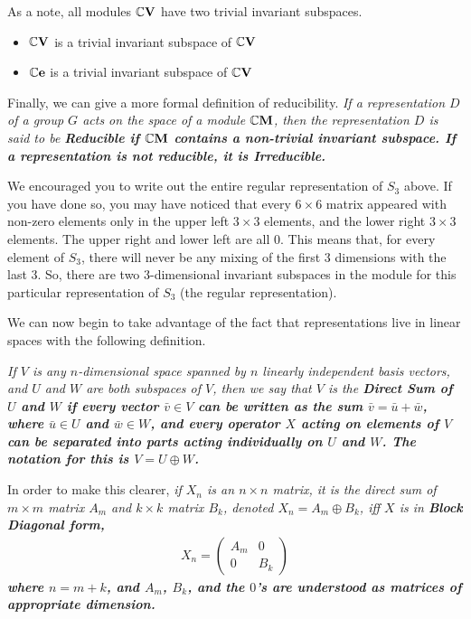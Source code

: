 \documentclass[12pt,epsf]{article}
\def\nolabel{\nonumber }
\def\nolabel{\nonumber }
\begin{document}
As a note, all modules $\mathbb{C}\bf V \rm$ have two trivial invariant
subspaces.
\begin{itemize}
\parskip 0pt
\item $\mathbb{C}\bf V\rm$ is a trivial invariant subspace of
$\mathbb{C}\bf V\rm$
\item $\mathbb{C}\bf e\rm$ is a trivial invariant subspace of
$\mathbb{C}\bf V\rm$
\end{itemize}  

Finally, we can give a more formal definition of reducibility.	\it If
a representation $D$ of a group $G$ acts on the space of a module
$\mathbb{C}\bf M\it$, then the representation $D$ is said to be \bf
Reducible \it if $\mathbb{C}\bf M\it$ contains a non-trivial invariant
subspace.  If a representation is not reducible, it is \bf
Irreducible\rm.  

We encouraged you to write out the entire regular representation of
$S_3$ above.  If you have done so, you may have noticed that every
$6\times 6$ matrix appeared with non-zero elements only in the upper
left $3\times 3$ elements, and the lower right $3\times 3$ elements. 
The upper right and lower left are all 0.  This means that, for every
element of $S_3$, there will never be any mixing of the first 3
dimensions with the last 3.  So, there are two 3-dimensional
invariant subspaces in the module for this particular representation of
$S_3$ (the regular representation).  

We can now begin to take advantage of the fact that representations
live in linear spaces with the following definition.  

\it If $V$ is any $n$-dimensional space spanned by $n$ linearly
independent basis vectors, and $U$ and $W$ are both subspaces of $V$,
then we say that $V$ is the \bf Direct Sum \it of $U$ and $W$ if every
vector $\bar v \in V$ can be written as the sum $\bar v = \bar u + \bar
w$, where $\bar u \in U$ and $\bar w \in W$, and every operator $X$
acting on elements of $V$ can be separated into parts acting
individually on $U$ and $W$.  The notation for this is $V = U \oplus
W$.  \rm

In order to make this clearer, \it if $X_n$ is an $n\times n$ matrix,
it is the direct sum of $m\times m$ matrix $A_m$ and $k\times k$ matrix
$B_k$, denoted $X_n = A_m\oplus B_k$, iff $X$ is in \bf Block Diagonal
\it form,
\begin{eqnarray}
X_n = 
\begin{pmatrix}
A_m & 0 \\ 0 & B_k
\end{pmatrix}\nolabel 
\end{eqnarray}
where $n=m+k$, and $A_m$, $B_k$, and the $0$'s are understood as
matrices of appropriate dimension.  \rm
\end{document}
